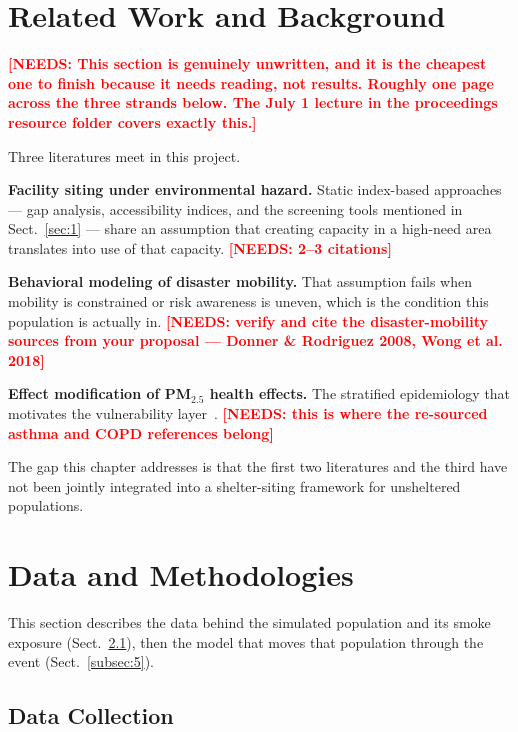\documentclass[graybox]{svmult}
\newcommand{\NEEDS}[1]{\textcolor{red}{\textbf{[NEEDS: #1]}}}
\begin{document}
\section{Related Work and Background}
\label{sec:2}

\NEEDS{This section is genuinely unwritten, and it is the cheapest one to finish
because it needs reading, not results. Roughly one page across the three strands
below. The July 1 lecture in the proceedings resource folder covers exactly this.}

Three literatures meet in this project.

\textbf{Facility siting under environmental hazard.} Static index-based
approaches --- gap analysis, accessibility indices, and the screening tools
mentioned in Sect.~\ref{sec:1} --- share an assumption that creating capacity in
a high-need area translates into use of that capacity.
\NEEDS{2--3 citations}

\textbf{Behavioral modeling of disaster mobility.} That assumption fails when
mobility is constrained or risk awareness is uneven, which is the condition this
population is actually in.
\NEEDS{verify and cite the disaster-mobility sources from your proposal ---
Donner \& Rodriguez 2008, Wong et al. 2018}

\textbf{Effect modification of PM$_{2.5}$ health effects.} The stratified
epidemiology that motivates the vulnerability layer~\cite{di2017}.
\NEEDS{this is where the re-sourced asthma and COPD references belong}

The gap this chapter addresses is that the first two literatures and the third
have not been jointly integrated into a shelter-siting framework for unsheltered
populations.

\section{Data and Methodologies}
\label{sec:3}

This section describes the data behind the simulated population and its smoke
exposure (Sect.~\ref{subsec:2}), then the model that moves that population
through the event (Sect.~\ref{subsec:5}).

\subsection{Data Collection}
\label{subsec:2}
\end{document}
